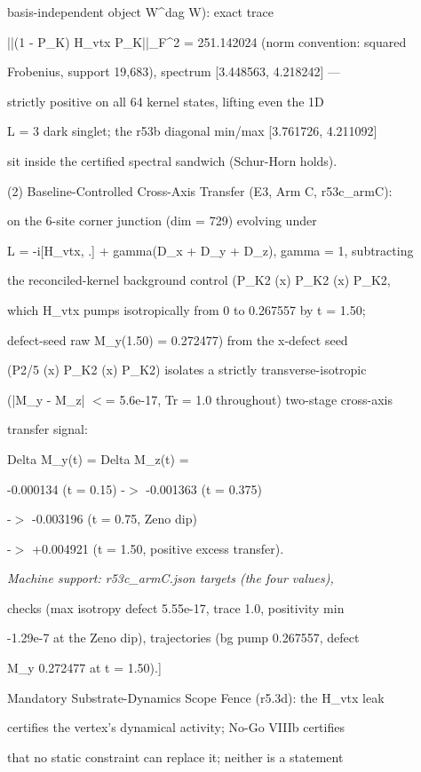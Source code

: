 \documentclass[11pt,a4paper]{article}
\theoremstyle{definition}
\begin{document}
basis-independent object W\^{}dag W): exact trace

||(1 - P\_K) H\_vtx P\_K||\_F\^{}2 = 251.142024 (norm convention: squared

Frobenius, support 19,683), spectrum [3.448563, 4.218242] —

strictly positive on all 64 kernel states, lifting even the 1D

L = 3 dark singlet; the r53b diagonal min/max [3.761726, 4.211092]

sit inside the certified spectral sandwich (Schur-Horn holds).


(2) Baseline-Controlled Cross-Axis Transfer (E3, Arm C, r53c\_armC):

on the 6-site corner junction (dim = 729) evolving under

L = -i[H\_vtx, .] + gamma(D\_x + D\_y + D\_z), gamma = 1, subtracting

the reconciled-kernel background control (P\_K2 (x) P\_K2 (x) P\_K2,

which H\_vtx pumps isotropically from 0 to 0.267557 by t = 1.50;

defect-seed raw M\_y(1.50) = 0.272477) from the x-defect seed

(P2/5 (x) P\_K2 (x) P\_K2) isolates a strictly transverse-isotropic

(|M\_y - M\_z| $<$= 5.6e-17, Tr = 1.0 throughout) two-stage cross-axis

transfer signal:


    Delta M\_y(t) = Delta M\_z(t) =

      -0.000134 (t = 0.15) -$>$ -0.001363 (t = 0.375)

      -$>$ -0.003196 (t = 0.75, Zeno dip)

      -$>$ +0.004921 (t = 1.50, positive excess transfer).


\small\emph{Machine support: r53c\_armC.json targets (the four values),}
\par\medskip\noindent
checks (max isotropy defect 5.55e-17, trace 1.0, positivity min

-1.29e-7 at the Zeno dip), trajectories (bg pump 0.267557, defect

M\_y 0.272477 at t = 1.50).]


Mandatory Substrate-Dynamics Scope Fence (r5.3d): the H\_vtx leak

certifies the vertex's dynamical activity; No-Go VIIIb certifies

that no static constraint can replace it; neither is a statement
\end{document}
